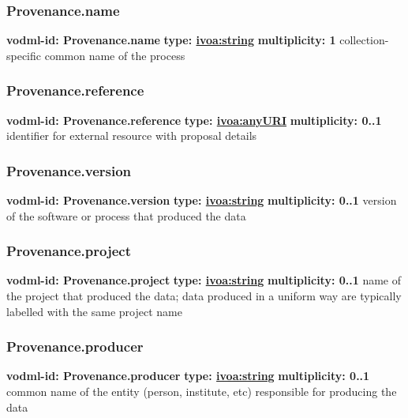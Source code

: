     \subsubsection{Provenance.name}
      \textbf{vodml-id: Provenance.name} \newline
      \textbf{type: \hyperref[sect:ivoa]{ivoa:string}} \newline
      \textbf{multiplicity: 1} \newline
      collection-specific common name of the process

    \subsubsection{Provenance.reference}
      \textbf{vodml-id: Provenance.reference} \newline
      \textbf{type: \hyperref[sect:ivoa]{ivoa:anyURI}} \newline
      \textbf{multiplicity: 0..1} \newline
      identifier for external resource with proposal details

    \subsubsection{Provenance.version}
      \textbf{vodml-id: Provenance.version} \newline
      \textbf{type: \hyperref[sect:ivoa]{ivoa:string}} \newline
      \textbf{multiplicity: 0..1} \newline
      version of the software or process that produced the data

    \subsubsection{Provenance.project}
      \textbf{vodml-id: Provenance.project} \newline
      \textbf{type: \hyperref[sect:ivoa]{ivoa:string}} \newline
      \textbf{multiplicity: 0..1} \newline
      name of the project that produced the data; data produced in a uniform way are typically labelled with the same project name

    \subsubsection{Provenance.producer}
      \textbf{vodml-id: Provenance.producer} \newline
      \textbf{type: \hyperref[sect:ivoa]{ivoa:string}} \newline
      \textbf{multiplicity: 0..1} \newline
      common name of the entity (person, institute, etc) responsible for producing the data

